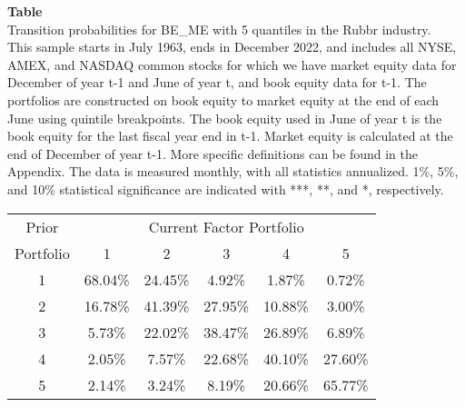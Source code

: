 \begin{table*}[ht!]
\raggedright
{}
\label{tab: transition_probs_BE_ME_Rubbr_with_5_quantiles}
\textbf{Table \thetable} \\
Transition probabilities for BE_ME with 5 quantiles in the Rubbr industry. \\
\hspace*{1em}This sample starts in July 1963, ends in December 2022, and includes all NYSE, AMEX, and NASDAQ common stocks for which we have market equity data for December of year t-1 and June of year t, and book equity data for t-1. The portfolios are constructed on book equity to market equity at the end of each June using quintile breakpoints.  The book equity used in June of year t is the book equity for the last fiscal year end in t-1.  Market equity is calculated at the end of December of year t-1.  More specific definitions can be found in the Appendix.  The data is measured monthly, with all statistics annualized.  1\%, 5\%, and 10\% statistical significance are indicated with ***, **, and *, respectively. \\
\vspace{0.5em}
\centering
\begin{adjustbox}{max width=\textwidth}
\begin{tabular}{@{}cccccc@{}}
\toprule
Prior & \multicolumn{5}{c}{Current Factor Portfolio} \\
Portfolio & 1 & 2 & 3 & 4 & 5 \\
\midrule
1 & 68.04\% & 24.45\% & 4.92\% & 1.87\% & 0.72\% \\
2 & 16.78\% & 41.39\% & 27.95\% & 10.88\% & 3.00\% \\
3 & 5.73\% & 22.02\% & 38.47\% & 26.89\% & 6.89\% \\
4 & 2.05\% & 7.57\% & 22.68\% & 40.10\% & 27.60\% \\
5 & 2.14\% & 3.24\% & 8.19\% & 20.66\% & 65.77\% \\
\bottomrule
\end{tabular}
\end{adjustbox}
\end{table*}